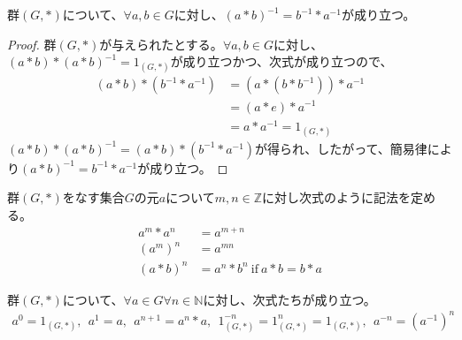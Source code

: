 \documentclass[dvipdfmx]{jsarticle}
\begin{document}
\begin{thm}\label{3.1.1.3}
群$(G,*)$について、$\forall a,b \in G$に対し、$(a*b)^{- 1} = b^{- 1}*a^{- 1}$が成り立つ。
\end{thm}
\begin{proof}
群$(G,*)$が与えられたとする。$\forall a,b \in G$に対し、$(a*b)*(a*b)^{- 1} = 1_{(G,*)}$が成り立つかつ、次式が成り立つので、
\begin{align*}
(a*b)*\left( b^{- 1}*a^{- 1} \right) &= \left( a*\left( b*b^{- 1} \right) \right)*a^{- 1}\\
&= (a*e)*a^{- 1}\\
&= a*a^{- 1} = 1_{(G,*)}
\end{align*}
$(a*b)*(a*b)^{- 1} = (a*b)*\left( b^{- 1}*a^{- 1} \right)$が得られ、したがって、簡易律により$(a*b)^{- 1} = b^{- 1}*a^{- 1}$が成り立つ。
\end{proof}
\begin{dfn}
群$(G,*)$をなす集合$G$の元$a$について$m,n \in \mathbb{Z}$に対し次式のように記法を定める。
\begin{align*}
a^{m}*a^{n} &= a^{m + n}\\
\left( a^{m} \right)^{n} &= a^{mn}\\
(a*b)^{n} &= a^{n}*b^{n}\ \mathrm{if}\ a*b = b*a
\end{align*}
\end{dfn}
\begin{thm}\label{3.1.1.4}
群$(G,*)$について、$\forall a \in G\forall n \in \mathbb{N}$に対し、次式たちが成り立つ。
\begin{align*}
a^{0} = 1_{(G,*)},\ \ a^{1} = a,\ \ a^{n + 1} = a^{n}*a,\ \ 1_{(G,*)}^{- n} = 1_{(G,*)}^{n} = 1_{(G,*)},\ \ a^{- n} = \left( a^{- 1} \right)^{n}
\end{align*}
\end{thm}
\end{document}
